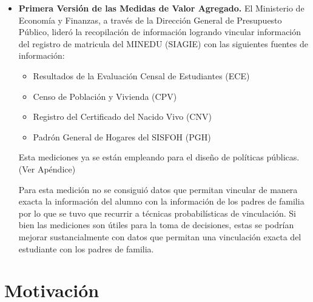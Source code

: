 \documentclass[11pt]{article}
\numberwithin{equation}{section}
\begin{document}
\begin{itemize}
\item {\bf Primera Versi\'on de las Medidas de Valor Agregado.} El Ministerio de Econom\'ia y Finanzas, a trav\'es de la Direcci\'on General de Presupuesto P\'ublico, lider\'o la recopilaci\'on de informaci\'on logrando vincular informaci\'on del registro de matricula del MINEDU (SIAGIE) con las siguientes fuentes de informaci\'on:
\begin{itemize}
    \item Resultados de la Evaluaci\'on Censal de Estudiantes (ECE)
    \item Censo de Poblaci\'on y Vivienda (CPV)
    \item Registro del Certificado del Nacido Vivo (CNV)
    \item Padr\'on General de Hogares del SISFOH (PGH)
\end{itemize}

Esta mediciones ya se est\'an empleando para el dise\~{n}o de pol\'iticas p\'ublicas. (Ver Ap\'endice)

 Para esta medici\'on no se consigui\'o datos que permitan vincular de manera exacta la informaci\'on del alumno con la informaci\'on de los padres de familia por lo que se tuvo que recurrir a t\'ecnicas probabil\'isticas de vinculaci\'on. Si bien las mediciones son \'utiles para la toma de decisiones, estas se podr\'ian mejorar sustancialmente con datos que permitan una vinculaci\'on exacta del estudiante con los padres de familia.

\end{itemize}
\section{Motivaci\'on} 
\end{document}
